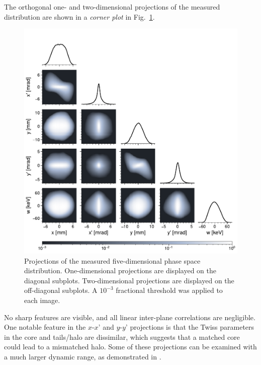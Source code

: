 \documentclass[%
 reprint,
 amsmath,amssymb,
 aps,
prstab,
]{revtex4-2}
\begin{document}
The orthogonal one- and two-dimensional projections of the measured distribution are shown in a \textit{corner plot} in Fig.~\ref{fig:corner}.
%
\begin{figure}[]
    \centering
    \includegraphics[width=\columnwidth]{fig2.pdf}
    \caption{Projections of the measured five-dimensional phase space distribution. One-dimensional projections are displayed on the diagonal subplots. Two-dimensional projections are displayed on the off-diagonal subplots. A $10^{-3}$ fractional threshold was applied to each image.}
    \label{fig:corner}
\end{figure}
%
No sharp features are visible, and all linear inter-plane correlations are negligible. One notable feature in the $x$-$x’$ and $y$-$y’$ projections is that the Twiss parameters in the core and tails/halo are dissimilar, which suggests that a matched core could lead to a mismatched halo. Some of these projections can be examined with a much larger dynamic range, as demonstrated in \cite{Aleksandrov2021}.
\end{document}
